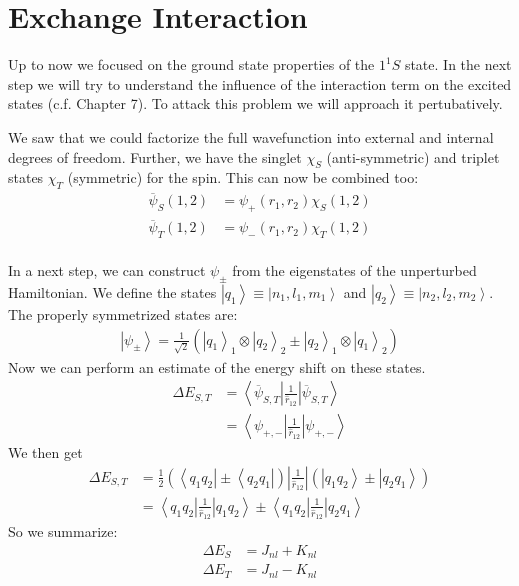 \documentclass[10pt]{article}
\let\cite\citep
\providecommand\citep{\cite}
\newcommand{\bra}[1]{\ensuremath{\left\langle#1\right|}}
\newcommand{\ket}[1]{\ensuremath{\left|#1\right\rangle}}
\begin{document}
\section{Exchange Interaction}
Up to now we focused on the ground state properties of the $1^
1S$ state. In the next step we will try to understand the influence of the interaction term on the excited states (c.f. \cite{Hertel_2015} Chapter 7). To attack this problem we will approach it pertubatively.

We saw that we could factorize the full wavefunction into external and internal degrees of freedom. Further, we have the singlet $\chi_S$ (anti-symmetric) and triplet states $\chi_T$ (symmetric) for the spin. This can now be combined too:
\begin{align}
\overline{\psi}_S(1,2) &= \psi_{+}(r_1, r_2)\chi_S(1,2)\\
\overline{\psi}_T(1,2) &= \psi_{-}(r_1, r_2)\chi_T(1,2)\\
\end{align}

In a next step, we can construct $\psi_{\pm}$ from the eigenstates of the unperturbed Hamiltonian. We define the states $\ket{q_1} \equiv \ket{n_1,l_1,m_1}$ and $\ket{q_2} \equiv \ket{n_2,l_2,m_2}$. The properly symmetrized states are:
%
\begin{align}
\ket{\psi_\pm} = \frac{1}{\sqrt{2}}\left( \ket{q_1}_1 \otimes \ket{q_2}_2 \pm \ket{q_2}_1 \otimes \ket{q_1}_2 \right)
\end{align}
Now we can perform an estimate of the energy shift on these states.
\begin{align}
\Delta E_{S,T} &= \bra{\overline{\psi}_{S,T} }\frac{1}{\hat{r}_{12}} \ket{\overline{\psi}_{S,T}}\\
&= \bra{\psi_{+,-} }\frac{1}{\hat{r}_{12}} \ket{\psi_{+,-} }
\end{align}
We then get
%
\begin{align}
\Delta E_{S,T} &= \frac{1}{2} \left(\bra{q_1 q_2 } \pm \bra{q_2 q_1}\right) \left| \frac{1}{\hat{r}_{12}} \right| \left( \ket{q_1 q_2} \pm \ket{q_2 q_1} \right)\\
&= \bra{q_1 q_2} \frac{1}{\hat{r}_{12}}\ket{q_1 q_2} \pm \bra{q_1 q_2} \frac{1}{\hat{r}_{12}} \ket{q_2 q_1}
\end{align}
So we summarize:
\begin{align}
\Delta E_S &= J_{nl} + K_{nl}\\
\Delta E_T &= J_{nl} - K_{nl}
\end{align}
\end{document}

